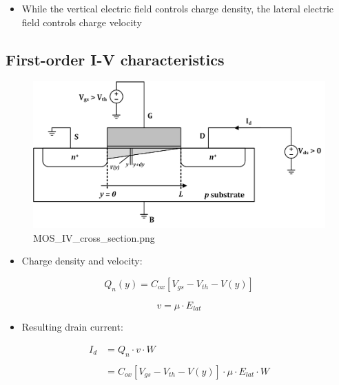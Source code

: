 \documentclass[11pt]{article}
\providecommand{\tightlist}{%
      \setlength{\itemsep}{0pt}\setlength{\parskip}{0pt}}
\begin{document}
\begin{itemize}
\tightlist
\item
  While the vertical electric field controls charge density, the lateral
  electric field controls charge velocity
\end{itemize}

    \hypertarget{first-order-i-v-characteristics}{%
\subsection{First-order I-V
characteristics}\label{first-order-i-v-characteristics}}

    \begin{figure}
\centering
\includegraphics{MOS_IV_cross_section.png}
\caption{MOS\_IV\_cross\_section.png}
\end{figure}

    \begin{itemize}
\tightlist
\item
  Charge density and velocity:
\end{itemize}

\begin{equation}
Q_n(y) = C_{ox}[V_{gs} - V_{th} - V(y)]
\end{equation}

\begin{equation}
v = \mu \cdot E_{lat}
\end{equation}

    \begin{itemize}
\tightlist
\item
  Resulting drain current:
\end{itemize}

\begin{align}
I_d &= Q_n \cdot v \cdot W \\
\\
&= C_{ox}[V_{gs} - V_{th} - V(y)] \cdot \mu \cdot E_{lat} \cdot W \\
\end{align}
\end{document}
